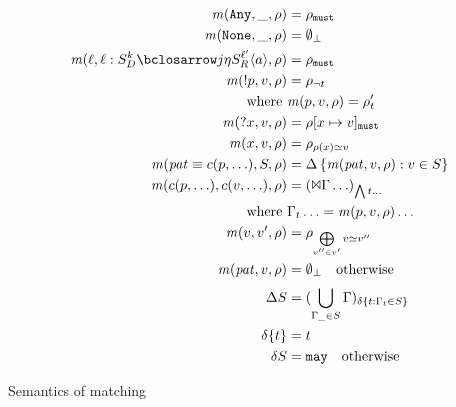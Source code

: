   {\begin{align*}
    \matches(\sany, \_, \menv) &= \menv_\must \\
    \matches(\snone, \_, \menv) &= \emptyset_\bot \\
    \matches(\mtoplevelname,
    \bclos{\mtoplevelname}{\mscon_D}{k}{j}{\mtimeline}{\mscon_R}{\mmlab^{\prime}}{\maddr},
    \menv) &= \menv_\must \\
    \matches(\snegpat{\mvpat}, \mdata, \menv) &= \menv_{\neg \mvaluation} \\
    \text{where }& \matches(\mvpat, \mdata, \menv) = \menv'_\mvaluation \\
    \matches(\sbind{\mvar}, \mdata, \menv) &= \menv[\mvar \mapsto \mdata]_\must \\
    \matches(\mvar, \mdata, \menv) &= \menv_{\menv(\mvar) \simeq \mdata} \\
    \matches(\mpat\equiv\mconstructor(\mvpat, \ldots), S, \menv) &= \Delta\setbuild{\matches(\mpat, \mdata, \menv)}{\mdata \in S} \\
    \matches(\mconstructor(\mvpat, \ldots), \mconstructor(\mdata, \ldots), \menv) &= (\Bowtie \menvs \ldots)_{\bigwedge \mvaluation \ldots} \\
    \text{where }& \menvs_\mvaluation \ldots = \matches(\mvpat, \mdata, \menv) \ldots \\
    \matches(\mdata, \mdata', \menv) &= \menv_{\bigoplus\limits_{\mdata'' \in \mdata'}{{\mdata \simeq \mdata''}}} \\
    \matches(\mpat, \mdata, \menv) &= \emptyset_\bot \quad
    \text{otherwise}
    \\[2pt]
    \Delta S &= (\bigcup\limits_{\menvs_{\_} \in S}\menvs)_{\delta \setbuild{\mvaluation}{\menvs_\mvaluation \in S}} \\
    \delta \setof{\mvaluation} &= \mvaluation \\
    \delta S &= \may \quad \text{otherwise}
  \end{align*}}{\caption{Semantics of matching}\label{fig:matchsem}}

